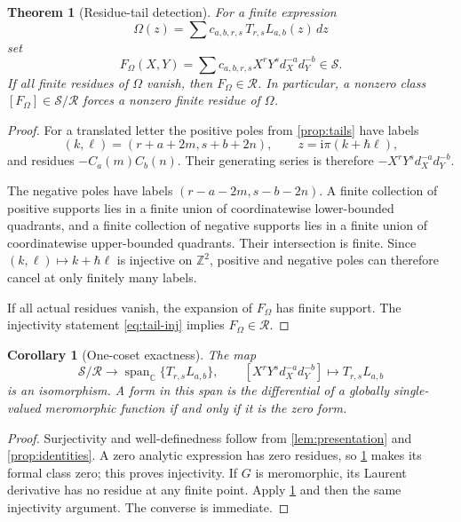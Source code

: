 \documentclass[11pt]{article}
\numberwithin{equation}{section}
\newtheorem{theorem}{Theorem}[section]
\newtheorem{corollary}[corollary]{Corollary}
\theoremstyle{definition}
\theoremstyle{remark}
\newcommand{\C}{\mathbb C}
\newcommand{\Z}{\mathbb Z}
\newcommand{\dd}{\,d}
\newcommand{\ii}{\mathrm i}
\newcommand{\calR}{\mathcal R}
\newcommand{\calS}{\mathcal S}
\newcommand{\qh}{\hbar}
\begin{document}
\begin{theorem}[Residue-tail detection]\label{thm:tail}
For a finite expression
\begin{equation}\label{eq:finiteOmega}
 \Omega(z)=\sum c_{a,b,r,s}\,T_{r,s}L_{a,b}(z)\dd z
\end{equation}
set
\[
 F_\Omega(X,Y)=\sum c_{a,b,r,s}X^rY^sd_X^{-a}d_Y^{-b}\in\calS.
\]
If all finite residues of $\Omega$ vanish, then $F_\Omega\in\calR$.
In particular, a nonzero class $[F_\Omega]\in\calS/\calR$ forces a nonzero
finite residue of $\Omega$.
\end{theorem}
\begin{proof}
For a translated letter the positive poles from \cref{prop:tails} have labels
\begin{equation}\label{eq:positive-label}
 (k,\ell)=(r+a+2m,s+b+2n),\qquad
 z=\ii\pi(k+\qh\ell),
\end{equation}
and residues $-C_a(m)C_b(n)$. Their generating series is therefore
$-X^rY^sd_X^{-a}d_Y^{-b}$.

The negative poles have labels
$(r-a-2m,s-b-2n)$. A finite collection of positive supports lies in a finite
union of coordinatewise lower-bounded quadrants, and a finite collection of
negative supports lies in a finite union of coordinatewise upper-bounded
quadrants. Their intersection is finite. Since
$(k,\ell)\mapsto k+\qh\ell$ is injective on $\Z^2$, positive and negative
poles can therefore cancel at only finitely many labels.

If all actual residues vanish, the expansion of $F_\Omega$ has finite
support. The injectivity statement \eqref{eq:tail-inj} implies
$F_\Omega\in\calR$.
\end{proof}

\begin{corollary}[One-coset exactness]\label{cor:onecoset}
The map
\[
 \calS/\calR\longrightarrow
 \operatorname{span}_{\C}\{T_{r,s}L_{a,b}\},\qquad
 [X^rY^sd_X^{-a}d_Y^{-b}]\longmapsto T_{r,s}L_{a,b}
\]
is an isomorphism. A form in this span is the differential of a globally
single-valued meromorphic function if and only if it is the zero form.
\end{corollary}
\begin{proof}
Surjectivity and well-definedness follow from \cref{lem:presentation} and
\cref{prop:identities}. A zero analytic expression has zero residues, so
\cref{thm:tail} makes its formal class zero; this proves injectivity.
If $G$ is meromorphic, its Laurent derivative has no residue at any finite
point. Apply \cref{thm:tail} and then the same injectivity argument.
The converse is immediate.
\end{proof}
\end{document}
